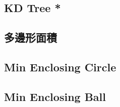 \documentclass[a4paper,10pt,twocolumn,oneside]{article}
\begin{document}
\subsection{KD Tree *}

% 

\subsection{多邊形面積}


%

% 

% 

\subsection{Min Enclosing Circle}


\subsection{Min Enclosing Ball}


%

% 

% 
\end{document}
